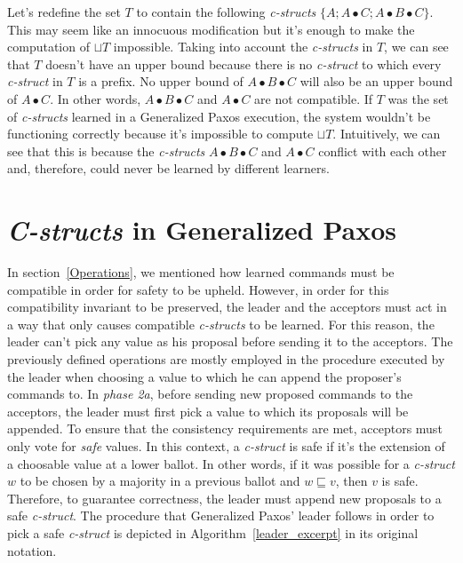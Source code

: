 Let's redefine the set $T$ to contain the following \textit{c-structs} $\{A ; A \bullet C ; A \bullet B \bullet C\}$. This may seem like an innocuous modification but it's enough to make the computation of $\sqcup T$ impossible. Taking into account the \textit{c-structs} in $T$, we can see that $T$ doesn't have an upper bound because there is no \textit{c-struct} to which every \textit{c-struct} in $T$ is a prefix. No upper bound of $A \bullet B \bullet C$ will also be an upper bound of $A \bullet C$. In other words, $A \bullet B \bullet C$ and $A \bullet C$ are not compatible. {\color{red} If $T$ was the set of \textit{c-structs} learned in a Generalized Paxos execution, the system wouldn't be functioning correctly because it's impossible to compute $\sqcup T$. Intuitively, we can see that this is because the \textit{c-structs} $A \bullet B \bullet C$ and $A \bullet C$ conflict with each other and, therefore, could never be learned by different learners.} \par 


\section{\textit{C-structs} in Generalized Paxos}
{\color{red}In section~\ref{Operations}, we mentioned how learned commands must be compatible in order for safety to be upheld. However, in order for this compatibility invariant to be preserved, the leader and the acceptors must act in a way that only causes compatible \textit{c-structs} to be learned. For this reason, the leader can't pick any value as his proposal before sending it to the acceptors. The previously defined operations are mostly employed in the procedure executed by the leader when choosing a value to which he can append the proposer's commands to. In \textit{phase 2a}, before sending new proposed commands to the acceptors, the leader must first pick a value to which its proposals will be appended.} To ensure that the consistency requirements are met, acceptors must only vote for \textit{safe} values. In this context, a \textit{c-struct} is safe if it's the extension of a choosable value at a lower ballot. In other words, if it was possible for a \textit{c-struct} $w$ to be chosen by a majority in a previous ballot and $w \sqsubseteq v$, then $v$ is safe. Therefore, to guarantee correctness, the leader must append new proposals to a safe \textit{c-struct}. The procedure that Generalized Paxos' leader follows in order to pick a safe \textit{c-struct} is depicted in Algorithm~\ref{leader_excerpt} in its original notation.\par

